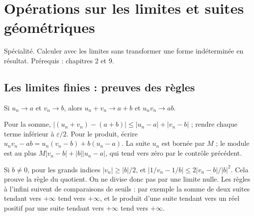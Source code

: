 \documentclass[../cours_tle.tex]{subfiles}
\begin{document}
\setcounter{chapter}{9}
\chapter{Opérations sur les limites et suites géométriques}
\label{ch:10}
\begin{objectif}
Spécialité. Calculer avec les limites sans transformer une forme indéterminée en résultat. Prérequis : chapitres 2 et 9.
\end{objectif}
\section{Les limites finies : preuves des règles}
Si $u_n\to a$ et $v_n\to b$, alors $u_n+v_n\to a+b$ et $u_nv_n\to ab$.
\begin{demonstration}
Pour la somme, $|(u_n+v_n)-(a+b)|\le|u_n-a|+|v_n-b|$ ; rendre chaque terme inférieur à $\varepsilon/2$.
Pour le produit, écrire $u_nv_n-ab=u_n(v_n-b)+b(u_n-a)$. La suite $u_n$ est bornée par $M$ ; le module est au plus $M|v_n-b|+|b||u_n-a|$, qui tend vers zéro par le contrôle précédent.
\end{demonstration}
Si $b\ne0$, pour les grands indices $|v_n|\ge |b|/2$, et
$|1/v_n-1/b|\le2|v_n-b|/|b|^2$. Cela prouve la règle du quotient. On ne divise donc pas par une limite nulle.
Les règles à l'infini suivent de comparaisons de seuils : par exemple la somme de deux suites tendant vers $+\infty$ tend vers $+\infty$, et le produit d'une suite tendant vers un réel positif par une suite tendant vers $+\infty$ tend vers $+\infty$.
\end{document}
